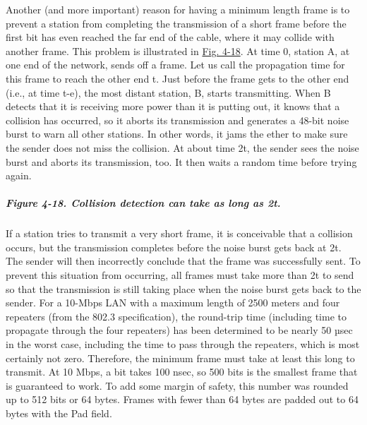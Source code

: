 Another (and more important) reason for having a minimum length frame is
to prevent a station from completing the transmission of a short frame
before the first bit has even reached the far end of the cable, where it
may collide with another frame. This problem is illustrated in
\protect\hyperlink{0130661023_ch04lev1sec3.htmlux5cux23ch04fig18}{Fig.
4-18}. At time 0, station {A}, at one end of the network, sends off a
frame. Let us call the propagation time for this frame to reach the
other end {t}. Just before the frame gets to the other end (i.e., at
time {t}-{e}), the most distant station, {B}, starts transmitting. When
{B} detects that it is receiving more power than it is putting out, it
knows that a collision has occurred, so it aborts its transmission and
generates a 48-bit noise burst to warn all other stations. In other
words, it jams the ether to make sure the sender does not miss the
collision. At about time 2{t}, the sender sees the noise burst and
aborts its transmission, too. It then waits a random time before trying
again.

\subparagraph[Figure 4-18. Collision detection can take as long as
2{t}.]{\texorpdfstring{\protect\hypertarget{0130661023_ch04lev1sec3.htmlux5cux23ch04fig18}{}{}Figure
4-18. Collision detection can take as long as
2{t}.}{Figure 4-18. Collision detection can take as long as 2t.}}


If a station tries to transmit a very short frame, it is conceivable
that a collision occurs, but the transmission completes before the noise
burst gets back at 2{t}. The sender will then incorrectly conclude that
the frame was successfully sent. To prevent this situation from
occurring, all frames must take more than 2{t} to send so that the
transmission is still taking place when the noise burst gets back to the
sender. For a 10-Mbps LAN with a maximum length of 2500 meters and four
repeaters (from the 802.3 specification), the round-trip time (including
time to propagate through the four repeaters) has been determined to be
nearly 50 µsec in the worst case, including the time to pass through the
repeaters, which is most certainly not zero. Therefore, the minimum
frame must take at least this long to transmit. At 10 Mbps, a bit takes
100 nsec, so 500 bits is the smallest frame that is guaranteed to work.
To add some margin of safety, this number was rounded up to 512 bits or
64 bytes. Frames with fewer than 64 bytes are padded out to 64 bytes
with the {Pad} field.

